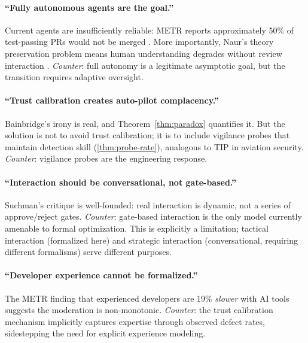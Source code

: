 \paragraph{``Fully autonomous agents are the goal.''} Current agents are insufficiently reliable: METR reports approximately 50\% of test-passing PRs would not be merged \citep{metr2026}. More importantly, Naur's theory preservation problem means human understanding degrades without review interaction \citep{naur1985programming}. \emph{Counter}: full autonomy is a legitimate asymptotic goal, but the transition requires adaptive oversight.

\paragraph{``Trust calibration creates auto-pilot complacency.''} Bainbridge's irony is real, and Theorem~\ref{thm:paradox} quantifies it. But the solution is not to avoid trust calibration; it is to include vigilance probes that maintain detection skill (\ref{thm:probe-rate}), analogous to TIP in aviation security. \emph{Counter}: vigilance probes are the engineering response.

\paragraph{``Interaction should be conversational, not gate-based.''} Suchman's critique \citep{suchman1987plans} is well-founded: real interaction is dynamic, not a series of approve/reject gates. \emph{Counter}: gate-based interaction is the only model currently amenable to formal optimization. This is explicitly a limitation; tactical interaction (formalized here) and strategic interaction (conversational, requiring different formalisms) serve different purposes.

\paragraph{``Developer experience cannot be formalized.''} The METR finding that experienced developers are 19\% \emph{slower} with AI tools \citep{metr2026} suggests the moderation is non-monotonic. \emph{Counter}: the trust calibration mechanism implicitly captures expertise through observed defect rates, sidestepping the need for explicit experience modeling.

